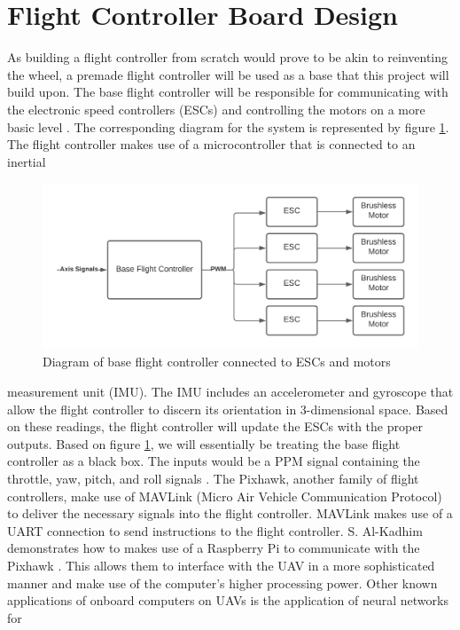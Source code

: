 \documentclass[english]{upeeei}
\begin{document}
\section{Flight Controller Board Design}
As building a flight controller from scratch would prove to be akin to reinventing the wheel, a premade flight controller
will be used as a base that this project will build upon. The base flight controller will be responsible for communicating
with the electronic speed controllers (ESCs) and controlling the motors on a more basic level \cite{MultiwiiFC}. 
The corresponding diagram for the system is represented by figure \ref{fig:base_FC_diagram}. The flight controller makes 
use of a microcontroller that is connected to an inertial
\begin{figure}[h]
    \centering
    \includegraphics[scale=0.5]{images/base_FC_diagram.png}
    \caption{Diagram of base flight controller connected to ESCs and motors}
    \label{fig:base_FC_diagram}
\end{figure}
measurement unit (IMU). The IMU includes an accelerometer and gyroscope that allow the flight controller to discern its 
orientation in 3-dimensional space. Based on these readings, the flight controller will update the ESCs with the proper
outputs. Based on figure \ref{fig:base_FC_diagram}, we will essentially be treating the base flight controller as a black
box. The inputs would be a PPM signal containing the throttle, yaw, pitch, and roll signals \cite{MultiwiiFC}.
The Pixhawk, another family of flight controllers, make use of MAVLink (Micro Air Vehicle Communication Protocol) to 
deliver the necessary signals into the flight controller. MAVLink makes use of a UART
connection to send instructions to the flight controller. 
S. Al-Kadhim demonstrates how to makes use of a Raspberry Pi to communicate with the Pixhawk \cite{RPiMavlink2019}. This 
allows them to interface with the UAV in a more sophisticated manner and make use of the computer's
higher processing power. Other known applications of onboard computers on UAVs is the application of neural networks for
\end{document}
